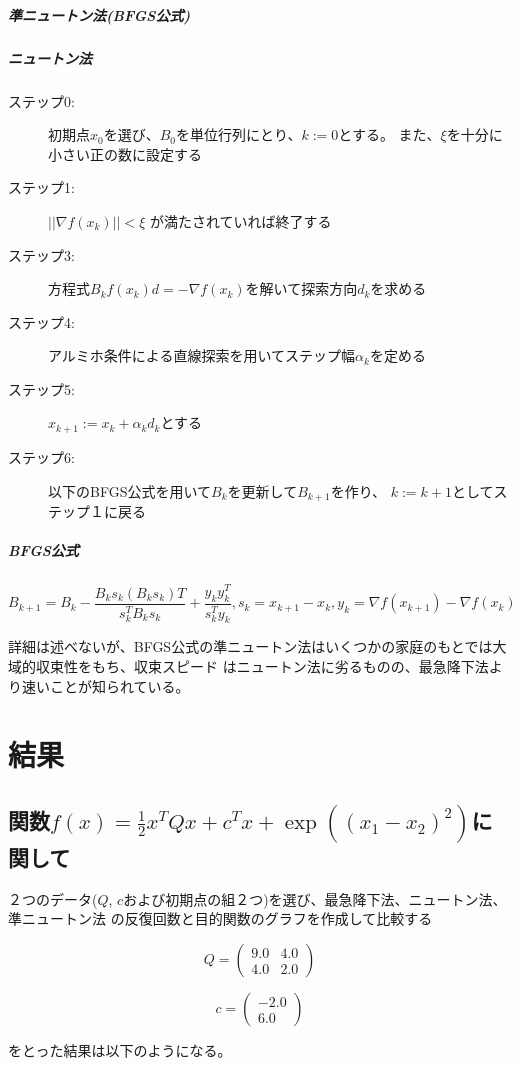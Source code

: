 \documentclass{jsarticle}
\begin{document}
\subparagraph{準ニュートン法(BFGS公式)}
\subparagraph{ニュートン法}
\begin{description}
  \item[ステップ0:] 初期点$x_0$を選び、$B_0$を単位行列にとり、$k := 0$とする。
    また、$\xi$を十分に小さい正の数に設定する
  \item[ステップ1:] $||\nabla f(x_k)|| < \xi$ が満たされていれば終了する
  \item[ステップ3:] 方程式$B_kf(x_k)d = -\nabla f(x_k)$を解いて探索方向$d_k$を求める
  \item[ステップ4:] アルミホ条件による直線探索を用いてステップ幅${\alpha}_k$を定める
  \item[ステップ5:] $x_{k + 1} := x_k + {\alpha}_k d_k$とする
  \item[ステップ6:] 以下のBFGS公式を用いて$B_k$を更新して$B_{k+1}$を作り、
    $k := k + 1$としてステップ１に戻る
\end{description}

\subparagraph{BFGS公式}
$$
B_{k + 1} = B_{k} - \frac {B_ks_k(B_ks_k)T}{s^{T}_{k}B_ks_k} + \frac {y_ky_{k}^{T}}{s^{T}_{k}y_k}
, s_k = x_{k+1} - x_{k}, y_k = \nabla f(x_{k+1}) - \nabla f(x_k)
$$

詳細は述べないが、BFGS公式の準ニュートン法はいくつかの家庭のもとでは大域的収束性をもち、収束スピード
はニュートン法に劣るものの、最急降下法より速いことが知られている。


\section{結果}
\subsection{関数$f(x) = \frac {1}{2} x^TQx + c^Tx + \exp ({(x_1 - x_2)}^2)$に関して}
２つのデータ($Q$, $c$および初期点の組２つ)を選び、最急降下法、ニュートン法、準ニュートン法
の反復回数と目的関数のグラフを作成して比較する


\[
  Q = \left(
    \begin{array}{ccc}
      9.0 & 4.0 \\
      4.0 & 2.0
    \end{array}
  \right)
\]


\[
  c = \left(
    \begin{array}{ccc}
      -2.0 \\
       6.0
    \end{array}
  \right)
\]

をとった結果は以下のようになる。
\end{document}
